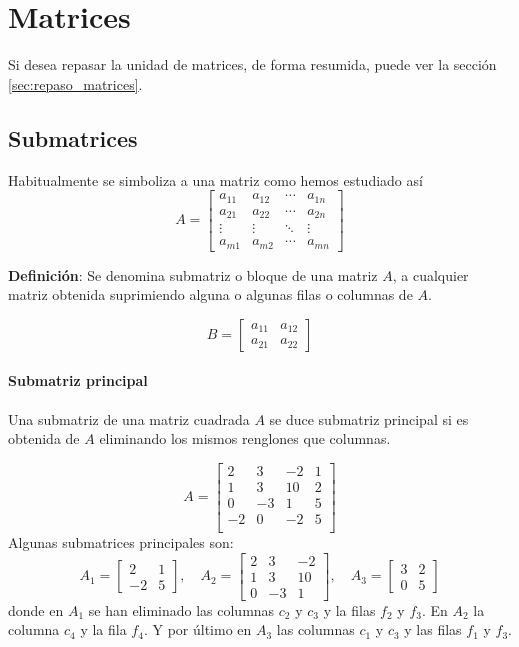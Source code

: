 \section{Matrices}

Si desea repasar la unidad de matrices, de forma resumida, puede ver la sección \ref{sec:repaso_matrices}.

\subsection{Submatrices}

Habitualmente se simboliza a una matriz como hemos estudiado así
\[
A = \begin{bmatrix}
  a_{11} & a_{12} & \cdots & a_{1n}\\
  a_{21} & a_{22} & \cdots & a_{2n}\\
  \vdots & \vdots & \ddots & \vdots \\
  a_{m1} & a_{m2} & \cdots & a_{mn}
\end{bmatrix}
\]

\textbf{Definición}: Se denomina submatriz o bloque de una matriz \(A\), a cualquier matriz obtenida suprimiendo alguna o algunas filas o columnas de \(A\).

\[
B = \begin{bmatrix}
  a_{11} & a_{12}\\
  a_{21} & a_{22}
\end{bmatrix}
\]

\paragraph{Submatriz principal}

Una submatriz de una matriz cuadrada \(A\) se duce submatriz principal si es obtenida de \(A\) eliminando los mismos renglones que columnas. 

\[
A = \begin{bmatrix}
  2 & 3 & -2 & 1\\
  1 & 3 & 10 & 2\\
  0 & -3 & 1 & 5\\
  -2 & 0 & -2 & 5\\
\end{bmatrix}
\]
Algunas submatrices principales son:
\[
  A_1 =\begin{bmatrix}
    2 & 1 \\
    -2 & 5
  \end{bmatrix},\quad A_2 = \begin{bmatrix}
    2 & 3 & -2 \\
    1 & 3 & 10 \\
    0 & -3 & 1 
  \end{bmatrix}, \quad A_3 = \begin{bmatrix}
    3 & 2\\
    0 & 5 
  \end{bmatrix}
\]
donde en \(A_1\) se han eliminado las columnas \(c_2\) y \(c_3\) y la filas \(f_2\) y \(f_3\). En \(A_2\) la columna \(c_4\) y la fila \(f_4\). Y por último en \(A_3\) las columnas \(c_1\) y \(c_3\) y las filas \(f_1\) y \(f_3\).

